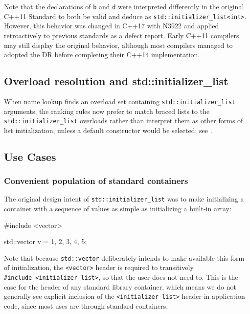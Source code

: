 \noindent Note that the declarations of \lstinline!b! and \lstinline!d! were interpreted
differently in the original C++11 Standard to both be valid and deduce
as \lstinline!std::initializer_list<int>!. However, this behavior was
changed in C++17 with N3922 and applied retroactively to previous
standards as a defect report. Early C++11 compilers may still display
the original behavior, although most compilers managed to adopted the DR
before completing their C++14 implementation.

\subsection[Overload resolution and \lstinline!std::initializer_list!]{Overload resolution and {\SubsubsecCode std::initializer\_list}}\label{overload-resolution-and-std::initializer_list}

When name lookup finds an overload set containing
\lstinline!std::initializer_list! arguments, the ranking rules now prefer
to match braced lists to the \lstinline!std::initializer_list! overloads
rather than interpret them as other forms of list initialization, unless
a default constructor would be selected; see .

\subsection[Use Cases]{Use Cases}\label{use-cases-initlist}

\subsubsection[Convenient population of standard containers]{Convenient population of standard containers}\label{convenient-population-of-standard-containers}

The original design intent of \lstinline!std::initializer_list! was to
make initializing a container with a sequence of values as simple as
initializing a built-in array:

\begin{emcppslisting}
#include <vector>

std::vector v = {1, 2, 3, 4, 5};
\end{emcppslisting}
    

\noindent Note that because \lstinline!std::vector! deliberately intends to make
available this form of initialization, the \lstinline!<vector>! header is
required to transitively
\lstinline!#include!~\lstinline!<initializer_list>!, so that the user does
not need to. This is the case for the header of any standard library
container, which means we do not generally see explicit inclusion of the
\lstinline!<initializer_list>! header in application code, since most uses
are through standard containers.

